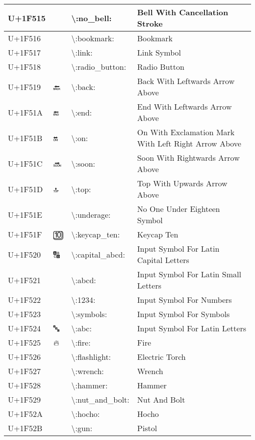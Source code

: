 \begin{table}[h]
\begin{tabulary}{\linewidth}{|L|L|L|L|}
\hline
U+1F515 & 🔕 & {\textbackslash}:no\_bell: & Bell With Cancellation Stroke \\
\hline
U+1F516 & 🔖 & {\textbackslash}:bookmark: & Bookmark \\
\hline
U+1F517 & 🔗 & {\textbackslash}:link: & Link Symbol \\
\hline
U+1F518 & 🔘 & {\textbackslash}:radio\_button: & Radio Button \\
\hline
U+1F519 & 🔙 & {\textbackslash}:back: & Back With Leftwards Arrow Above \\
\hline
U+1F51A & 🔚 & {\textbackslash}:end: & End With Leftwards Arrow Above \\
\hline
U+1F51B & 🔛 & {\textbackslash}:on: & On With Exclamation Mark With Left Right Arrow Above \\
\hline
U+1F51C & 🔜 & {\textbackslash}:soon: & Soon With Rightwards Arrow Above \\
\hline
U+1F51D & 🔝 & {\textbackslash}:top: & Top With Upwards Arrow Above \\
\hline
U+1F51E & 🔞 & {\textbackslash}:underage: & No One Under Eighteen Symbol \\
\hline
U+1F51F & 🔟 & {\textbackslash}:keycap\_ten: & Keycap Ten \\
\hline
U+1F520 & 🔠 & {\textbackslash}:capital\_abcd: & Input Symbol For Latin Capital Letters \\
\hline
U+1F521 & 🔡 & {\textbackslash}:abcd: & Input Symbol For Latin Small Letters \\
\hline
U+1F522 & 🔢 & {\textbackslash}:1234: & Input Symbol For Numbers \\
\hline
U+1F523 & 🔣 & {\textbackslash}:symbols: & Input Symbol For Symbols \\
\hline
U+1F524 & 🔤 & {\textbackslash}:abc: & Input Symbol For Latin Letters \\
\hline
U+1F525 & 🔥 & {\textbackslash}:fire: & Fire \\
\hline
U+1F526 & 🔦 & {\textbackslash}:flashlight: & Electric Torch \\
\hline
U+1F527 & 🔧 & {\textbackslash}:wrench: & Wrench \\
\hline
U+1F528 & 🔨 & {\textbackslash}:hammer: & Hammer \\
\hline
U+1F529 & 🔩 & {\textbackslash}:nut\_and\_bolt: & Nut And Bolt \\
\hline
U+1F52A & 🔪 & {\textbackslash}:hocho: & Hocho \\
\hline
U+1F52B & 🔫 & {\textbackslash}:gun: & Pistol \\

\end{tabulary}
\end{table}
